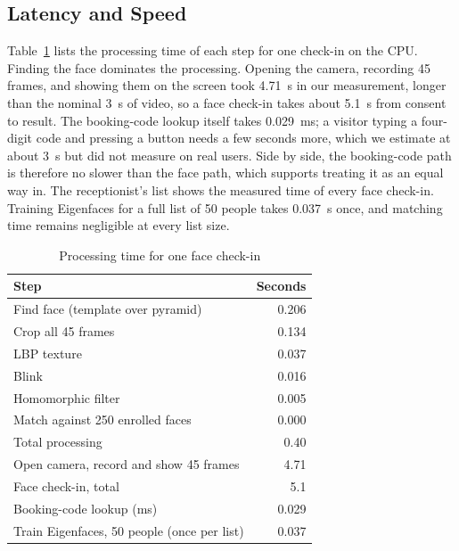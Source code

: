 \documentclass[conference,a4paper]{IEEEtran}
\begin{document}
\subsection{Latency and Speed}
Table~\ref{tab:speed} lists the processing time of each step for one check-in on the CPU. Finding the face dominates the processing. Opening the camera, recording 45 frames, and showing them on the screen took 4.71~s in our measurement, longer than the nominal 3~s of video, so a face check-in takes about 5.1~s from consent to result. The booking-code lookup itself takes 0.029~ms; a visitor typing a four-digit code and pressing a button needs a few seconds more, which we estimate at about 3~s but did not measure on real users. Side by side, the booking-code path is therefore no slower than the face path, which supports treating it as an equal way in. The receptionist's list shows the measured time of every face check-in. Training Eigenfaces for a full list of 50 people takes 0.037~s once, and matching time remains negligible at every list size.

\begin{table}[t]
\caption{Processing time for one face check-in}
\label{tab:speed}
\centering\footnotesize
\begin{tabular}{@{}lr@{}}
\toprule
Step & Seconds \\
\midrule
Find face (template over pyramid) & 0.206 \\
Crop all 45 frames & 0.134 \\
LBP texture & 0.037 \\
Blink & 0.016 \\
Homomorphic filter & 0.005 \\
Match against 250 enrolled faces & 0.000 \\
\midrule
Total processing & 0.40 \\
Open camera, record and show 45 frames & 4.71 \\
\midrule
Face check-in, total & 5.1 \\
\midrule
Booking-code lookup (ms) & 0.029 \\
Train Eigenfaces, 50 people (once per list) & 0.037 \\
\bottomrule
\end{tabular}
\end{table}
\end{document}
